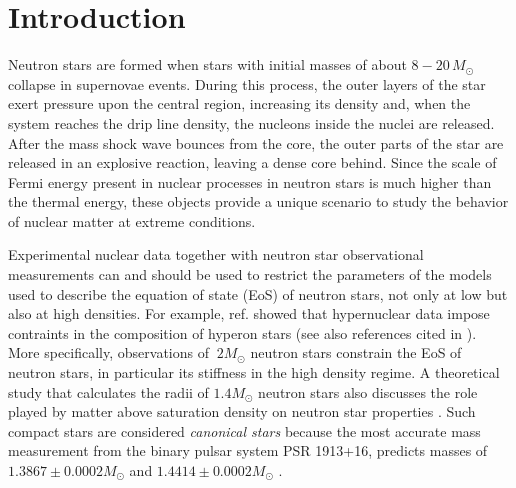 \documentclass[twocolumn,showpacs,aps]{revtex4}
\begin{document}
\maketitle
\section{Introduction} \label{sec:Int}


Neutron stars are formed when stars with initial masses of about $8-20\,M_{\odot}$ collapse in supernovae events. 
During this process, the outer layers of the star exert pressure upon the central region, increasing its density and,
when the system reaches the drip line density, the nucleons inside the nuclei are released. 
After the mass shock wave bounces from the core, the outer parts of the star are released in an explosive reaction, 
leaving a dense core behind.
Since the scale of Fermi energy present in nuclear processes in neutron stars is much higher than the thermal energy, 
these objects provide a unique scenario to study the behavior of nuclear matter at extreme conditions.

Experimental nuclear data together with neutron star observational measurements
can and should be used to restrict the parameters of the models used to describe 
the equation of state (EoS) of neutron stars, not only at low
but also at high densities.
For example, ref. \cite{SchaffnerBielich:2008kb} showed that hypernuclear data impose
contraints in the composition of hyperon stars (see also references cited in \cite{SchaffnerBielich:2008kb}).
More specifically, observations of $~2M_{\odot}$ neutron stars \cite{Demorest2010,Antoniadis2013} 
constrain the EoS of neutron stars, in particular its stiffness in the high density regime.
A theoretical study that calculates the radii of $1.4M_{\odot}$ neutron stars
also discusses the role played by matter above saturation density on neutron star properties \cite{Fortin:2014mya}. 
Such compact stars are considered \emph{canonical stars} because the most accurate mass measurement 
from the binary pulsar system PSR 1913+16, predicts masses of $1.3867\pm0.0002M_{\odot}$ and $1.4414\pm0.0002M_{\odot}$ 
\cite{Weisberg:2004hi,Lattimer:2004sa}.
\end{document}
